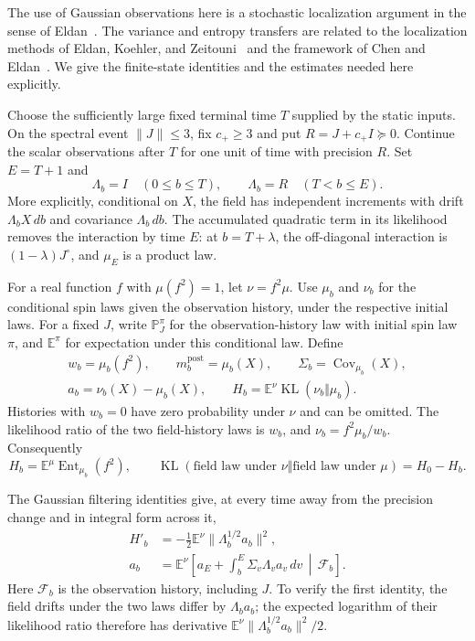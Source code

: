 The use of Gaussian observations here is a stochastic localization argument
in the sense of Eldan~\cite{Eldan2013StochasticLocalization}.
The variance and entropy transfers are related to the localization methods
of Eldan, Koehler, and Zeitouni~\cite{EldanKoehlerZeitouni2022} and the
framework of Chen and Eldan~\cite{ChenEldan2025Localization}.
We give the finite-state identities and the estimates needed here explicitly.

Choose the sufficiently large fixed terminal time $T$ supplied by the static
inputs.  On the spectral event $\|J\|\le3$, fix $c_+\ge3$ and put
$R=J+c_+I\succeq0$.  Continue the scalar observations after $T$ for one unit
of time with precision $R$.  Set $E=T+1$ and
\[
 \Lambda_b=I\quad(0\le b\le T),\qquad
 \Lambda_b=R\quad(T<b\le E).
\]
More explicitly, conditional on $X$, the field has independent increments
with drift $\Lambda_bX\,db$ and covariance $\Lambda_b\,db$.  The accumulated
quadratic term in its likelihood removes the interaction by time $E$:
at $b=T+\lambda$, the off-diagonal interaction is $(1-\lambda)J^\circ$, and
$\mu_E$ is a product law.

For a real function $f$ with $\mu(f^2)=1$, let $\nu=f^2\mu$.  Use $\mu_b$
and $\nu_b$ for the conditional spin laws given the observation history,
under the respective initial laws. For a fixed $J$, write
$\mathbb P_J^\pi$ for the observation-history law with initial spin law
$\pi$, and $\mathbb E^\pi$ for expectation under this conditional law.
Define
\[
 \begin{gathered}
 w_b=\mu_b(f^2),\qquad m_b^{\mathrm{post}}=\mu_b(X),\qquad
 \Sigma_b=\operatorname{Cov}_{\mu_b}(X),\\
 a_b=\nu_b(X)-\mu_b(X),\qquad
 H_b=\mathbb E^\nu\operatorname{KL}(\nu_b\Vert\mu_b).
 \end{gathered}
\]
Histories with $w_b=0$ have zero probability under $\nu$ and can be omitted.
The likelihood ratio of the two field-history laws is $w_b$, and
$\nu_b=f^2\mu_b/w_b$.  Consequently
\[
 H_b=\mathbb E^\mu\operatorname{Ent}_{\mu_b}(f^2),\qquad
 \operatorname{KL}(\text{field law under }\nu
                   \Vert\text{field law under }\mu)=H_0-H_b.
\]

The Gaussian filtering identities give, at every time away from the
precision change and in integral form across it,
\begin{equation}
 \begin{split}
 H'_b&=-\frac12\mathbb E^\nu
                  \|\Lambda_b^{1/2}a_b\|^2,\\
 a_b&=\mathbb E^\nu\left[
          a_E+\int_b^E\Sigma_v\Lambda_v a_v\,dv
          \,\middle|\,\mathcal F_b\right].
 \end{split}
 \label{prof:eq28}
\end{equation}
Here $\mathcal F_b$ is the observation history, including $J$.  To verify
the first identity, the field drifts under the two laws differ by
$\Lambda_ba_b$; the expected logarithm of their likelihood ratio therefore
has derivative $\mathbb E^\nu\|\Lambda_b^{1/2}a_b\|^2/2$.

